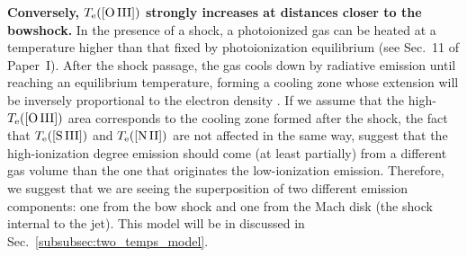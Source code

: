 \documentclass[twocolumn,linenumbers]{aastex63}
\begin{document}
{\bf Conversely, $T_{\rm e}(\text{[O\thinspace III]})$ strongly increases at distances closer to the bowshock.} In the presence of a shock, a photoionized gas can be heated at a temperature higher than that fixed by  photoionization equilibrium \citep{zeldovich67} (see Sec.~11 of Paper~I). After the shock passage, the gas cools down by radiative emission until reaching an equilibrium temperature, forming a cooling zone whose extension will be inversely proportional to the electron density \citep[][]{Hartigan87}. If we assume that the high-$T_{\rm e}(\text{[O\thinspace III]})$ area corresponds to the cooling zone formed after the shock, the fact that $T_{\rm e}(\text{[S\thinspace III]})$ and $T_{\rm e}(\text{[N\thinspace II]})$ are not affected in the same way, suggest that the high-ionization degree emission should come (at least partially) from a different gas volume than the one that originates the low-ionization  emission. Therefore, we suggest that we are seeing the superposition of two different emission components: one from the bow shock and one from the Mach disk (the shock internal to the jet). This model will be in discussed in Sec.~\ref{subsubsec:two_temps_model}.

\end{document}
